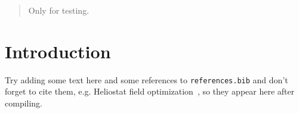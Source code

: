 \documentclass[12pt]{article}
\begin{document}
\maketitle

\begin{abstract}
Only for testing.
\end{abstract}

\section{Introduction}
Try adding some text here and some references to \texttt{references.bib} and don't forget to cite them, e.g. Heliostat ﬁeld optimization~\cite{profpaper}, so they appear here after compiling.



\end{document}

